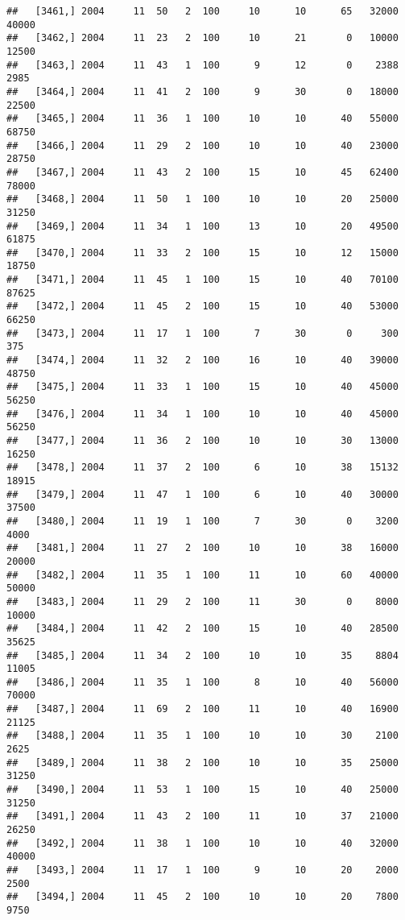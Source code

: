 \documentclass{article}\usepackage[]{graphicx}\usepackage[]{color}
\makeatletter
\newenvironment{kframe}{%
 \def\at@end@of@kframe{}%
 \ifinner\ifhmode%
  \def\at@end@of@kframe{\end{minipage}}%
  \begin{minipage}{\columnwidth}%
 \fi\fi%
 \def\FrameCommand##1{\hskip\@totalleftmargin \hskip-\fboxsep
 \colorbox{shadecolor}{##1}\hskip-\fboxsep
     \hskip-\linewidth \hskip-\@totalleftmargin \hskip\columnwidth}%
 \MakeFramed {\advance\hsize-\width
   \@totalleftmargin\z@ \linewidth\hsize
   \@setminipage}}%
 {\par\unskip\endMakeFramed%
 \at@end@of@kframe}
\newenvironment{knitrout}{}{} %
\makeatother
\begin{document}
\begin{knitrout}
\begin{kframe}
\begin{verbatim}
##   [3461,] 2004     11  50   2  100     10      10      65   32000   40000
##   [3462,] 2004     11  23   2  100     10      21       0   10000   12500
##   [3463,] 2004     11  43   1  100      9      12       0    2388    2985
##   [3464,] 2004     11  41   2  100      9      30       0   18000   22500
##   [3465,] 2004     11  36   1  100     10      10      40   55000   68750
##   [3466,] 2004     11  29   2  100     10      10      40   23000   28750
##   [3467,] 2004     11  43   2  100     15      10      45   62400   78000
##   [3468,] 2004     11  50   1  100     10      10      20   25000   31250
##   [3469,] 2004     11  34   1  100     13      10      20   49500   61875
##   [3470,] 2004     11  33   2  100     15      10      12   15000   18750
##   [3471,] 2004     11  45   1  100     15      10      40   70100   87625
##   [3472,] 2004     11  45   2  100     15      10      40   53000   66250
##   [3473,] 2004     11  17   1  100      7      30       0     300     375
##   [3474,] 2004     11  32   2  100     16      10      40   39000   48750
##   [3475,] 2004     11  33   1  100     15      10      40   45000   56250
##   [3476,] 2004     11  34   1  100     10      10      40   45000   56250
##   [3477,] 2004     11  36   2  100     10      10      30   13000   16250
##   [3478,] 2004     11  37   2  100      6      10      38   15132   18915
##   [3479,] 2004     11  47   1  100      6      10      40   30000   37500
##   [3480,] 2004     11  19   1  100      7      30       0    3200    4000
##   [3481,] 2004     11  27   2  100     10      10      38   16000   20000
##   [3482,] 2004     11  35   1  100     11      10      60   40000   50000
##   [3483,] 2004     11  29   2  100     11      30       0    8000   10000
##   [3484,] 2004     11  42   2  100     15      10      40   28500   35625
##   [3485,] 2004     11  34   2  100     10      10      35    8804   11005
##   [3486,] 2004     11  35   1  100      8      10      40   56000   70000
##   [3487,] 2004     11  69   2  100     11      10      40   16900   21125
##   [3488,] 2004     11  35   1  100     10      10      30    2100    2625
##   [3489,] 2004     11  38   2  100     10      10      35   25000   31250
##   [3490,] 2004     11  53   1  100     15      10      40   25000   31250
##   [3491,] 2004     11  43   2  100     11      10      37   21000   26250
##   [3492,] 2004     11  38   1  100     10      10      40   32000   40000
##   [3493,] 2004     11  17   1  100      9      10      20    2000    2500
##   [3494,] 2004     11  45   2  100     10      10      20    7800    9750

\end{verbatim}
\end{kframe}
\end{knitrout}
\end{document}
